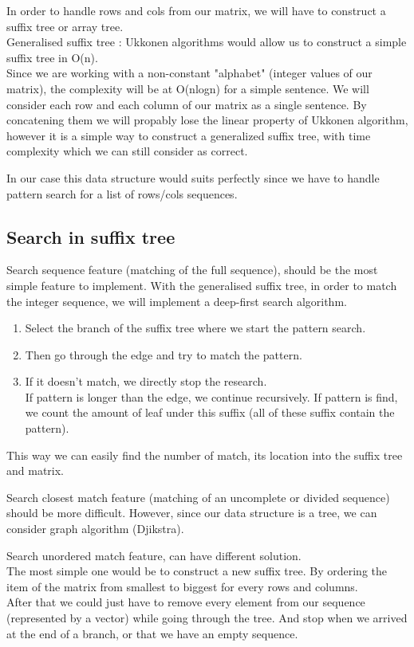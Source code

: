 \par
In order to handle rows and cols from our matrix, we will have to construct a suffix tree or array tree.\\
Generalised suffix tree : Ukkonen algorithms would allow us to construct a simple suffix tree in O(n).\\
Since we are working with a non-constant "alphabet" (integer values of our matrix), the complexity will be at O(nlogn)
for a simple sentence. We will consider each row and each column of our matrix as a single sentence. By concatening them we will propably lose the linear property of Ukkonen algorithm, however it is a simple way to construct a generalized suffix tree, with time complexity which we can still consider as correct.\\

\par
In our case this data structure would suits perfectly since we have to handle pattern search for a list of rows/cols sequences.

\subsection{Search in suffix tree}

\par
Search sequence feature (matching of the full sequence), should be the most simple feature to implement.
With the generalised suffix tree, in order to match the integer sequence, we will implement a deep-first search algorithm.
\begin{enumerate}
	\item Select the branch of the suffix tree where we start the pattern search.
	\item Then go through the edge and try to match the pattern.
	\item If it doesn't match, we directly stop the research.\\
	If pattern is longer than the edge, we continue recursively.
	If pattern is find, we count the amount of leaf under this suffix (all of these suffix contain the pattern).
\end{enumerate}
This way we can easily find the number of match, its location into the suffix tree and matrix.
\bigskip

\par
Search closest match feature (matching of an uncomplete or divided sequence) should be more difficult. However, since our data structure is a tree, we can consider graph algorithm (Djikstra).
\bigskip

\par
Search unordered match feature, can have different solution.\\
The most simple one would be to construct a new suffix tree. By ordering the item of the matrix from smallest to biggest for every rows and columns.\\
After that we could just have to remove every element from our sequence (represented by a vector) while going through the tree. And stop when we arrived at the end of a branch, or that we have an empty sequence.\\